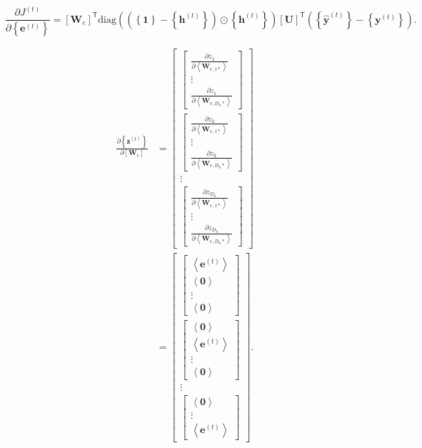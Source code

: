\documentclass[twoside]{article}
\begin{document}
	\begin{equation*}
		\frac{\partial J^{(t)}}{\partial\left\{\bm{e}^{(t)}\right\}} = \left[\bm{W}_e\right]^\mathsf{T}\mathrm{diag}\left(\left(\left\{\bm{1}\right\}-\left\{\bm{h}^{(t)}\right\}\right)\odot\left\{\bm{h}^{(t)}\right\}\right)\left[\bm{U}\right]^\mathsf{T}\left(\left\{\bm{\hat{y}}^{(t)}\right\}-\left\{\bm{y}^{(t)}\right\}\right).
	\end{equation*}
	
	\begin{align*}
		\frac{\partial\left\{\bm{z}^{(t)}\right\}}{\partial\left[\bm{W}_e\right]}
		&= \left[
		\begin{matrix}
		\left[
		\begin{matrix}
		\frac{\partial z_1}{\partial\left<\bm{W}_{e,1*}\right>}\\
		\vdots\\
		\frac{\partial z_1}{\partial\left<\bm{W}_{e,D_h*}\right>}
		\end{matrix}\right]\\
		\left[
		\begin{matrix}
		\frac{\partial z_2}{\partial\left<\bm{W}_{e,1*}\right>}\\
		\vdots\\
		\frac{\partial z_2}{\partial\left<\bm{W}_{e,D_h*}\right>}
		\end{matrix}\right]\\
		\vdots\\
		\left[
		\begin{matrix}
		\frac{\partial z_{D_h}}{\partial\left<\bm{W}_{e,1*}\right>}\\
		\vdots\\
		\frac{\partial z_{D_h}}{\partial\left<\bm{W}_{e,D_h*}\right>}
		\end{matrix}\right]
		\end{matrix}\right]\\
		&= \left[
		\begin{matrix}
		\left[
		\begin{matrix}
		\left<\bm{e}^{(t)}\right>\\
		\left<\bm{0}\right>\\
		\vdots\\
		\left<\bm{0}\right>
		\end{matrix}\right]\\
		\left[
		\begin{matrix}
		\left<\bm{0}\right>\\
		\left<\bm{e}^{(t)}\right>\\
		\vdots\\
		\left<\bm{0}\right>
		\end{matrix}\right]\\
		\vdots\\
		\left[
		\begin{matrix}
		\left<\bm{0}\right>\\
		\vdots\\
		\left<\bm{e}^{(t)}\right>
		\end{matrix}\right]
		\end{matrix}\right].
	\end{align*}
	
\end{document}
